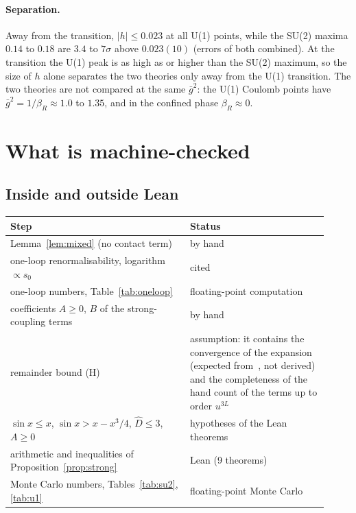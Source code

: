\documentclass[11pt,a4paper]{article}
\theoremstyle{definition}
\theoremstyle{remark}
\newcommand{\gb}{\bar g^{2}}
\newcommand{\bR}{\beta_R}
\begin{document}
\paragraph{Separation.} Away from the transition, $|h|\le0.023$ at all U(1) points, while the SU(2) maxima $0.14$ to $0.18$ are $3.4$ to $7\sigma$ above $0.023(10)$ (errors of both combined). At the transition the U(1) peak is as high as or higher than the SU(2) maximum, so the size of $h$ alone separates the two theories only away from the U(1) transition. The two theories are not compared at the same $\gb$: the U(1) Coulomb points have $\gb=1/\bR\approx1.0$ to $1.35$, and in the confined phase $\bR\approx0$.

\section{What is machine-checked}\label{sec:lean}

\subsection{Inside and outside Lean}

\begin{center}\small
\begin{tabular}{@{}p{0.52\linewidth}p{0.40\linewidth}@{}}\toprule
Step & Status\\\midrule
Lemma~\ref{lem:mixed} (no contact term) & by hand\\
one-loop renormalisability, logarithm $\propto s_0$ & cited~\cite{LNWW}\\
one-loop numbers, Table~\ref{tab:oneloop} & floating-point computation\\
coefficients $A\ge0$, $B$ of the strong-coupling terms & by hand\\
remainder bound (H) & assumption: it contains the convergence of the expansion (expected from~\cite{OS}, not derived) and the completeness of the hand count of the terms up to order $u^{3L}$\\
$\sin x\le x$, $\sin x>x-x^3/4$, $\hat D\le3$, $A\ge0$ & hypotheses of the Lean theorems\\
arithmetic and inequalities of Proposition~\ref{prop:strong} & Lean (9 theorems)\\
Monte Carlo numbers, Tables~\ref{tab:su2}, \ref{tab:u1} & floating-point Monte Carlo\\\bottomrule
\end{tabular}
\end{center}
\end{document}
